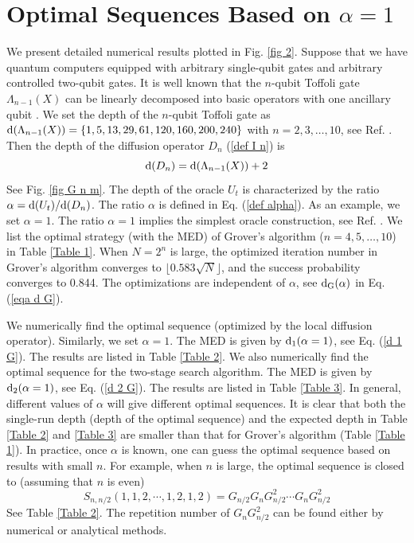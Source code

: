 \documentclass[%
 twocolumn,
 10pt,
 superscriptaddress,
 longbibliography,
 amsmath,amssymb,
 aps,
 pra,
floatfix,
]{revtex4-1}
\begin{document}
\section{\label{Appendix opt examples} Optimal Sequences Based on \texorpdfstring{$\alpha=1$}{Lg}}



We present detailed numerical results plotted in Fig. \ref{fig 2}. Suppose that we have quantum computers equipped with arbitrary single-qubit gates and arbitrary controlled two-qubit gates. It is well known that the $n$-qubit Toffoli gate $\Lambda_{n-1}(X)$ can be linearly decomposed into basic operators with one ancillary qubit \cite{BBCDMSSSW95}. We set the depth of the $n$-qubit Toffoli gate as $\text d(\Lambda_{n-1}(X))=\{1,5,13,29,61,120,160,200,240\}$ with $n=2,3,\ldots,10$, see Ref. \cite{BBCDMSSSW95}. Then the depth of the diffusion operator $D_n$ (\ref{def I n}) is
\begin{equation}
	\text d(D_n)=\text d(\Lambda_{n-1}(X))+2
\end{equation}
See Fig. \ref{fig G n m}. The depth of the oracle $U_t$ is characterized by the ratio $\alpha=\text d(U_t)/\text d(D_n)$. The ratio $\alpha$ is defined in Eq. (\ref{def alpha}). As an example, we set $\alpha=1$. The ratio $\alpha=1$ implies the simplest oracle construction, see Ref. \cite{FMLLDM17}. We list the optimal strategy (with the MED) of Grover's algorithm ($n=4,5,\ldots,10$) in Table \ref{Table 1}. When $N=2^n$ is large, the optimized iteration number in Grover's algorithm converges to $\lfloor 0.583\sqrt N\rfloor$, and the success probability converges to 0.844. The optimizations are independent of $\alpha$, see $\text d_\text{G}(\alpha)$ in Eq. (\ref{eqa d G}).

We numerically find the optimal sequence (optimized by the local diffusion operator). Similarly, we set $\alpha=1$. The MED is given by $\text d_1(\alpha=1)$, see Eq. (\ref{d 1 G}). The results are listed in Table \ref{Table 2}. We also numerically find the optimal sequence for the two-stage search algorithm. The MED is given by $\text d_2(\alpha=1)$, see Eq. (\ref{d 2 G}). The results are listed in Table \ref{Table 3}. In general, different values of $\alpha$ will give different optimal sequences. It is clear that both the single-run depth (depth of the optimal sequence) and the expected depth in Table \ref{Table 2} and \ref{Table 3} are smaller than that for Grover's algorithm (Table \ref{Table 1}). In practice, once $\alpha$ is known, one can guess the optimal sequence based on results with small $n$. For example, when $n$ is large, the optimal sequence is closed to (assuming that $n$ is even)
\begin{equation}
	S_{n,n/2}(1,1,2,\cdots,1,2,1,2) = G_{n/2}G_{n}G^2_{n/2}\cdots G_{n}G^2_{n/2}
\end{equation}
See Table \ref{Table 2}. The repetition number of $G_{n}G^2_{n/2}$ can be found either by numerical or analytical methods.
\end{document}
